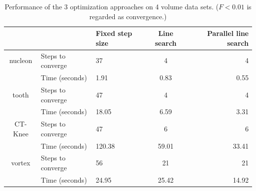 \begin{table}[h]
\begin{tabular}{ c | l | l c r }
& & Fixed step size & Line search & Parallel line search \\
\hline
nucleon & Steps to converge & 37 & 4 & 4 \\
& Time (seconds) & 1.91 & 0.83 & 0.55 \\
\hline
tooth & Steps to converge & 47 & 4 & 4 \\
& Time (seconds) & 18.05 & 6.59 & 3.31 \\
\hline
CT-Knee & Steps to converge & 47 & 6 & 6 \\
& Time (seconds) & 120.38 & 59.01 & 33.41 \\
\hline
vortex & Steps to converge & 56 & 21 & 21 \\
& Time (seconds) & 24.95 & 25.42 & 14.92 \\
\end{tabular}
\caption[Table caption text]{Performance of the 3 optimization approaches on 4 volume data sets. ($ F<0.01 $ is regarded as convergence.)}
\label{table:performance_table}
\end{table}


